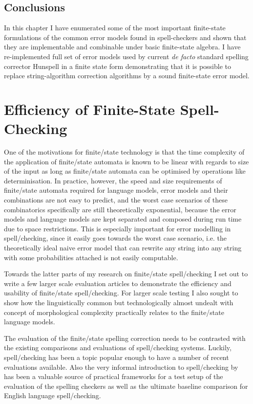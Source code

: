 \documentclass[officiallayout]{unihelcompling}
\begin{document}
\section{Conclusions}

In this chapter I have enumerated some of the most important finite-state
formulations of the common error models found in spell-checkers and shown that
they are implementable and combinable under basic finite-state algebra. I have
re-implemented full set of error models used by current \emph{de facto}
standard spelling corrector Hunspell in a finite state form demonstrating that
it is possible to replace string-algorithm correction algorithms by a sound
finite-state error model.

\chapter{Efficiency of Finite-State Spell-Checking}
\label{chap:efficiency}

One of the motivations for finite\-/state technology is that the time
complexity of the application of finite\-/state automata is known to be linear
with regards to size of the input as long as finite\-/state automata can be
optimised by operations like determinisation. In practice, however, the speed
and size requirements of finite\-/state automata required for language models,
error models and their combinations are not easy to predict, and the worst case
scenarios of these combinatorics specifically are still theoretically
exponential, because the error models and language models are kept separated
and composed during run time due to space restrictions. This is especially
important for error modelling in spell\-/checking, since it easily goes towards
the worst case scenario, i.e. the theoretically ideal naive error model that
can rewrite any string into any string with some probabilities attached is not
easily computable.

Towards the latter parts of my research on finite\-/state spell\-/checking I
set out to write a few larger scale evaluation articles to demonstrate the
efficiency and usability of finite\-/state spell\-/checking. For larger scale
testing I also sought to show how the linguistically common but technologically
almost undealt with concept of morphological complexity practically relates to
the finite\-/state language models.

The evaluation of the finite\-/state spelling correction needs to be contrasted
with the existing comparisons and evaluations of spell\-/checking systems.
Luckily, spell\-/checking has been a topic popular enough to have a number
of recent evaluations available.  Also the very informal introduction to
spell\-/checking by~\citet{norvig2010howto} has been a valuable source of
practical frameworks for a test setup of the evaluation of the spelling
checkers as well as the ultimate baseline comparison for English language
spell\-/checking.
\end{document}
